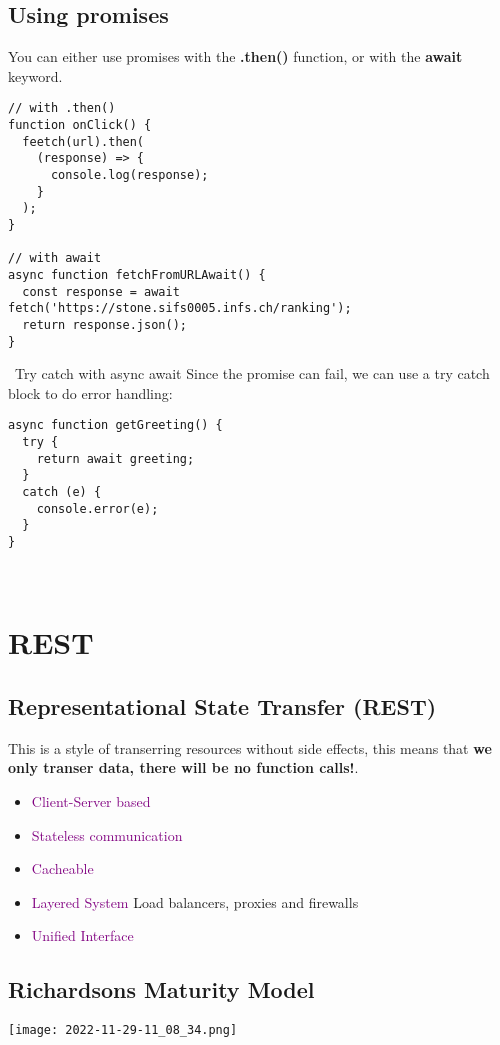\documentclass[main.tex,fontsize=6pt,paper=a4,paper=landscape,DIV=calc,]{scrartcl}
\begin{document}
\begin{multicols*}{4}
\subsection{Using promises}  
You can either use promises with the \textbf{.then()} function, or with the \textbf{await} keyword.
\begin{lstlisting}
// with .then()
function onClick() {
  feetch(url).then(
    (response) => {
      console.log(response);
    }
  );
}

// with await
async function fetchFromURLAwait() {
  const response = await fetch('https://stone.sifs0005.infs.ch/ranking');
  return response.json();
}
\end{lstlisting}
\, \newline
Try catch with async await  
Since the promise can fail, we can use a try catch block to do error handling:\newline 
\begin{lstlisting}
async function getGreeting() {
  try {
    return await greeting;
  }
  catch (e) {
    console.error(e);
  }
}
\end{lstlisting}
\, \newline





\section{REST}

\subsection{Representational State Transfer (REST)}  
This is a style of transerring resources without side effects, this means that \textbf{we only transer data, there will be no function calls!}.
\begin{itemize}
\item \textcolor{purple}{Client-Server based}
\item \textcolor{purple}{Stateless communication}
\item \textcolor{purple}{Cacheable}
\item \textcolor{purple}{Layered System} Load balancers, proxies and firewalls
\item \textcolor{purple}{Unified Interface}
\end{itemize} 

\subsection{Richardsons Maturity Model}  
\texttt{[image: 2022-11-29-11\_08\_34.png]}


\end{multicols*}
\end{document}
